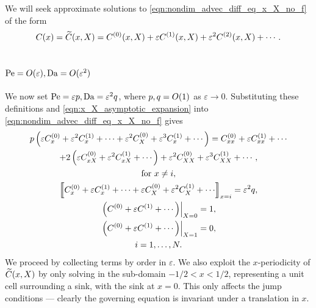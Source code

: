 We will seek approximate solutions to \eqref{eqn:nondim_advec_diff_eq_x_X_no_f}
of the form
\begin{equation}
    \label{eqn:x_X_asymptotic_expansion}
    C(x) = \widetilde{C}(x,X) = C^{(0)}(x,X) + \varepsilon C^{(1)}(x,X) + \varepsilon^2
    C^{(2)}(x,X) + \dotsb.
\end{equation}

\subsection{\(\mathrm{Pe} = O(\varepsilon), \mathrm{Da} = O(\varepsilon^2)\)}
\label{sec:0th-order,Pe=O(e),Da=O(e^2)}

We now set \(\mathrm{Pe} = \varepsilon p, \mathrm{Da} = \varepsilon^2 q\), where \(p, q =
O(1)\) as \(\varepsilon \to 0\). Substituting these definitions and
\eqref{eqn:x_X_asymptotic_expansion} into
\eqref{eqn:nondim_advec_diff_eq_x_X_no_f} gives
\begin{subequations}
    \label{eqn:full_Pe=O(e),Da=O(e^2)}
    \begin{gather}
        \begin{gathered}
            p \left(
            \varepsilon C^{(0)}_x + \varepsilon^2 C^{(1)}_x + \dotsb +
            \varepsilon^2 C^{(0)}_X + \varepsilon^3 C^{(1)}_x + \dotsb \right) =
            C^{(0)}_{xx} + \varepsilon C^{(1)}_{xx} + \dotsb\\
            + 2\left(\varepsilon C^{(0)}_{xX} + \varepsilon^2 C^{(1)}_{xX} +
            \dotsb \right) +
            \varepsilon^2 C^{(0)}_{XX} + \varepsilon^3 C^{(1)}_{XX} + \dotsb,
        \end{gathered}\\
        \nonumber \text{for } x \ne i,\\
        \jump{C^{(0)}_x + \varepsilon C^{(1)}_x + \dotsb + \varepsilon C^{(0)}_X
        + \varepsilon^2 C^{(1)}_X + \dotsb}_{x=i} = \varepsilon^2 q,\\
        \left.\left(C^{(0)} + \varepsilon C^{(1)} + \dotsb\right)\right|_{X=0}
        = 1,\\
        \left.\left(C^{(0)} + \varepsilon C^{(1)} + \dotsb\right)\right|_{X=1}
        = 0,\\
        \nonumber i = 1, \dotsc, N.
    \end{gather}
\end{subequations}
We proceed by collecting terms by order in \(\varepsilon\). We also exploit the
\(x\)-periodicity of \(\widetilde{C}(x,X)\) by only solving in the sub-domain
\(-1/2 < x < 1/2\), representing a unit cell surrounding a sink, with the
sink at \(x = 0\). This only affects the jump conditions --- clearly
the governing equation is invariant under a translation in \(x\).

